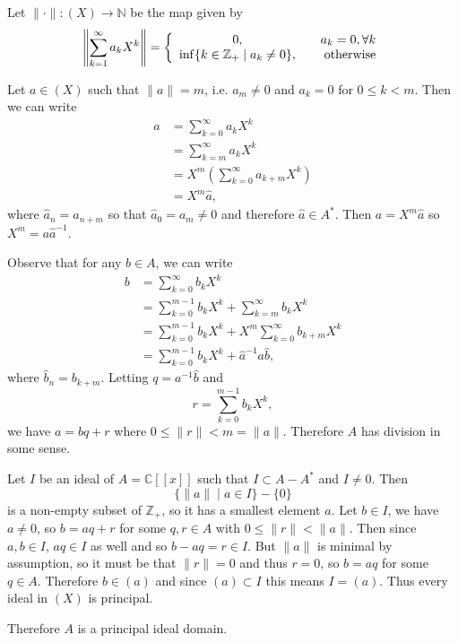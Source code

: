 \documentclass{article}
\begin{document}
\begin{Answer}
\begin{enumerate}[(a)]
{\begin{itemize}
{          Let $\| \cdot \| : (X) \to \mathbb{N}$ be the map given by
          $$
            \left\| \sum_{k=1}^\infty a_k X^k \right\|
          = \left\{\begin{array}{c r}
              0,                         & \quad a_k = 0, \forall k \\
              \inf \{
                     k \in \mathbb{Z}_+
                   \mid
                     a_k \neq 0
                   \},                  & \quad \text{otherwise}
            \end{array}\right.
          $$

          Let $a \in (X)$ such that $\|a\| = m$, i.e. $a_m \neq 0$ and
          $a_k = 0$ for $0 \leq k < m$. Then we can write
          \begin{align*}
          a &= \sum_{k=0}^\infty a_k X^k \\
            &= \sum_{k=m}^\infty a_k X^k \\
            &= X^m \left( \sum_{k=0}^\infty a_{k+m} X^k \right) \\
            &= X^m \hat{a},
          \end{align*}
          where $\hat{a}_n = a_{n+m}$ so that $\hat{a}_0 = a_m \neq 0$
          and therefore $\hat{a} \in A^\ast$. Then $a = X^m \hat{a}$
          so $X^m = a \hat{a}^{-1}$.

          Observe that for any $b \in A$, we can write
          \begin{align*}
            b &= \sum_{k=0}^\infty b_k X^k \\
              &= \sum_{k=0}^{m-1} b_k X^k
               + \sum_{k=m}^\infty b_k X^k \\
              &= \sum_{k=0}^{m-1} b_k X^k
               + X^m \sum_{k=0}^\infty b_{k+m} X^k \\
              &= \sum_{k=0}^{m-1} b_k X^k
               + \hat{a}^{-1} a \hat{b},
          \end{align*}
          where $\hat{b}_n = b_{k+m}$. Letting
          $q = a^{-1} \hat{b}$ and
          $$
          r = \sum_{k=0}^{m-1} b_k X^k,
          $$
          we have $a = bq + r$ where $0 \leq \|r\| < m = \|a\|$. Therefore
          $A$ has division in some sense.

          Let $I$ be an ideal of $A = \mathbb{C}[[x]]$ such that
          $I \subset A - A^\ast$ and $I \neq 0$. Then
          $$
          \{ \|a\| \mid a \in I \} - \{ 0 \}
          $$
          is a non-empty subset of $\mathbb{Z}_+$, so it has a
          smallest element $a$. Let $b \in I$, we have $a \neq 0$, so
          $b = aq + r$ for some $q, r \in A$ with $0 \leq \|r\| < \|a\|$.
          Then since $a, b \in I$, $aq \in I$ as well and so
          $b - aq = r \in I$. But $\|a\|$ is minimal by assumption, so
          it must be that $\|r\| = 0$ and thus $r = 0$, so $b = aq$ for some
          $q \in A$. Therefore $b \in (a)$ and since $(a) \subset I$
          this means $I = (a)$. Thus every ideal in $(X)$ is principal.
        }
      \end{itemize}
      Therefore $A$ is a principal ideal domain.

}
\end{enumerate}
\end{Answer}
\end{document}
